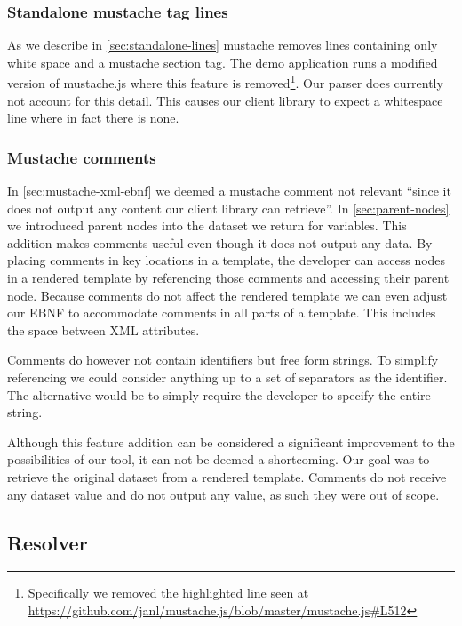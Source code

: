 \documentclass[thesis.tex]{subfiles}
\begin{document}
\subsubsection{Standalone mustache tag lines}
As we describe in \ref{sec:standalone-lines} mustache removes
lines containing only white space and a mustache section tag.
The demo application runs a modified version of mustache.js where this feature
is removed\footnote{
	Specifically we removed the highlighted line seen at
	\url{https://github.com/janl/mustache.js/blob/master/mustache.js\#L512}
}. Our parser does currently not account for this detail. This causes
our client library to expect a whitespace line where in fact there is none.

\subsubsection{Mustache comments}
\label{sec:comment-selectors}
In \ref{sec:mustache-xml-ebnf} we deemed a mustache comment not relevant
``since it does not output any content our client library can retrieve''.
In \ref{sec:parent-nodes} we introduced parent nodes into the dataset we return
for variables.
This addition makes comments useful even though it does not output any data.
By placing comments in key locations in a template, the developer can access
nodes in a rendered template by referencing those comments and accessing their
parent node. Because comments do not affect the rendered template we can even
adjust our EBNF to accommodate comments in all parts of a template.
This includes the space between XML attributes.

Comments do however not contain identifiers but free form strings.
To simplify referencing we could consider anything up to a set of
separators as the identifier. The alternative would be to simply require the
developer to specify the entire string.

Although this feature addition can be considered a significant improvement to
the possibilities of our tool, it can not be deemed a shortcoming.
Our goal was to retrieve the original dataset from a rendered template.
Comments do not receive any dataset value and do not output any value, as such
they were out of scope.

\subsection{Resolver}
\end{document}
